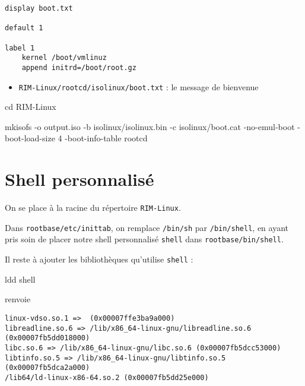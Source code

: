 \documentclass[]{article}
\newenvironment{Shaded}{}{}
\newcommand{\FunctionTok}[1]{\textcolor[rgb]{0.02,0.16,0.49}{{#1}}}
\newcommand{\BuiltInTok}[1]{{#1}}
\newcommand{\ExtensionTok}[1]{{#1}}
\newcommand{\NormalTok}[1]{{#1}}
\providecommand{\tightlist}{%
  \setlength{\itemsep}{0pt}\setlength{\parskip}{0pt}}
\begin{document}
\begin{verbatim}
display boot.txt

default 1

label 1
    kernel /boot/vmlinuz
    append initrd=/boot/root.gz
\end{verbatim}

\begin{itemize}
\tightlist
\item
  \texttt{RIM-Linux/rootcd/isolinux/boot.txt} : le message de bienvenue
\end{itemize}

\begin{Shaded}
\begin{Highlighting}[]
\BuiltInTok{cd} \NormalTok{RIM-Linux}

\ExtensionTok{mkisofs} \NormalTok{-o output.iso -b isolinux/isolinux.bin -c isolinux/boot.cat -no-emul-boot -boot-load-size 4 -boot-info-table rootcd}
\end{Highlighting}
\end{Shaded}

\section{Shell personnalisé}\label{shell-personnalisuxe9}

On se place à la racine du répertoire \texttt{RIM-Linux}.

Dans \texttt{rootbase/etc/inittab}, on remplace \texttt{/bin/sh} par
\texttt{/bin/shell}, en ayant pris soin de placer notre shell
personnalisé \texttt{shell} dans \texttt{rootbase/bin/shell}.

Il reste à ajouter les bibliothèques qu'utilise \texttt{shell} :

\begin{Shaded}
\begin{Highlighting}[]
\FunctionTok{ldd} \NormalTok{shell}
\end{Highlighting}
\end{Shaded}

renvoie

\begin{verbatim}
linux-vdso.so.1 =>  (0x00007ffe3ba9a000)
libreadline.so.6 => /lib/x86_64-linux-gnu/libreadline.so.6 (0x00007fb5dd018000)
libc.so.6 => /lib/x86_64-linux-gnu/libc.so.6 (0x00007fb5dcc53000)
libtinfo.so.5 => /lib/x86_64-linux-gnu/libtinfo.so.5 (0x00007fb5dca2a000)
/lib64/ld-linux-x86-64.so.2 (0x00007fb5dd25e000)
\end{verbatim}
\end{document}
